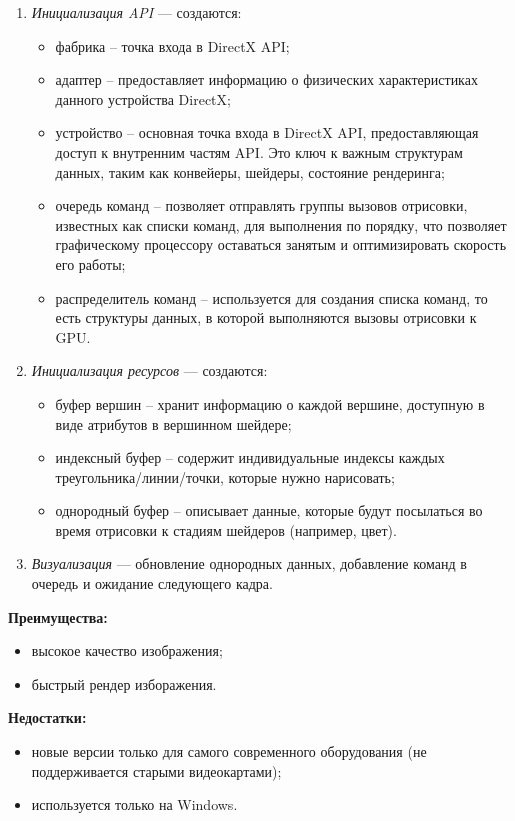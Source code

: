 \begin{enumerate}
    \item \textit{Инициализация API} — создаются:

    \begin{itemize}
        \item фабрика -- точка входа в DirectX API;
        \item адаптер -- предоставляет информацию о физических характеристиках данного устройства DirectX;
        \item устройство -- основная точка входа в DirectX API, предоставляющая доступ к внутренним частям API. Это ключ к важным структурам данных, таким как конвейеры, шейдеры, состояние рендеринга;
        \item очередь команд -- позволяет отправлять группы вызовов отрисовки, известных как списки команд, для выполнения по порядку, что позволяет графическому процессору оставаться занятым и оптимизировать скорость его работы;
        \item распределитель команд -- используется для создания списка команд, то есть структуры данных, в которой выполняются вызовы отрисовки к GPU.
    \end{itemize}
    \item \textit{Инициализация ресурсов} — создаются:
    \begin{itemize}
        \item буфер вершин -- хранит информацию о каждой вершине, доступную в виде атрибутов в вершинном шейдере;
        \item индексный буфер -- содержит индивидуальные индексы каждых треугольника/линии/точки, которые нужно нарисовать;
        \item однородный буфер -- описывает данные, которые будут посылаться во время отрисовки к стадиям шейдеров (например, цвет).
    \end{itemize}
    \item \textit{Визуализация} — обновление однородных данных, добавление команд в очередь и ожидание следующего кадра.
\end{enumerate}


\textbf{Преимущества:} 
\begin{itemize}
    \item высокое качество изображения;
    \item быстрый рендер изборажения.
\end{itemize}

\textbf{Недостатки:} 
\begin{itemize}
    \item новые версии только для самого современного оборудования (не поддерживается старыми видеокартами);
    \item используется только на Windows.
\end{itemize}


